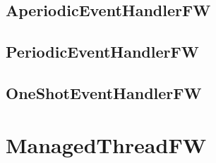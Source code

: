 \documentclass{article}
\begin{document}
\subsection{AperiodicEventHandlerFW}

\newpage

\subsection{PeriodicEventHandlerFW}

\newpage

\subsection{OneShotEventHandlerFW}

\newpage

\section{ManagedThreadFW}

\newpage
\end{document}
